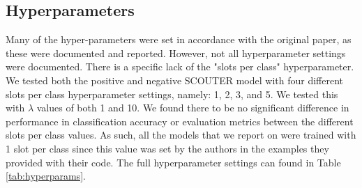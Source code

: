 \subsection{Hyperparameters}
Many of the hyper-parameters were set in accordance with the original paper, as these were documented and reported. However, not all hyperparameter settings were documented. There is a specific lack of the "slots per class" hyperparameter. We tested both the positive and negative SCOUTER model with four different slots per class hyperparameter settings, namely: 1, 2, 3, and 5. We tested this with $\lambda$ values of both 1 and 10. We found there to be no significant difference in performance in classification accuracy or evaluation metrics between the different slots per class values. As such, all the models that we report on were trained with 1 slot per class since this value was set by the authors in the examples they provided with their code. The full hyperparameter settings can found in Table \ref{tab:hyperparams}.

